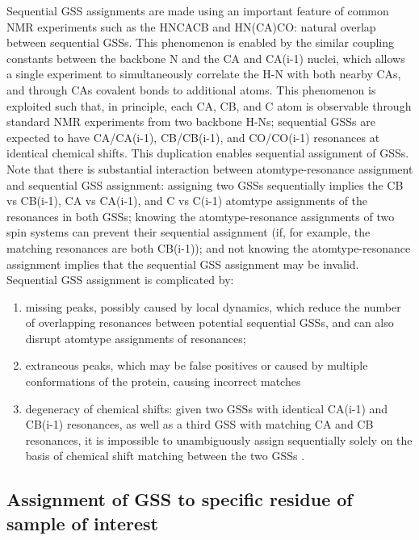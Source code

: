 Sequential GSS assignments are made using an important feature of common NMR 
experiments such as the HNCACB and HN(CA)CO: natural overlap between 
sequential GSSs.  This phenomenon is enabled by the similar coupling 
constants between the backbone N and the CA and CA(i-1) nuclei, which allows 
a single experiment to simultaneously correlate the H-N with both nearby CAs, 
and through CAs covalent bonds to additional atoms.  This phenomenon is 
exploited such that, in principle, each CA, CB, and C atom is observable 
through standard NMR experiments from two backbone H-Ns;  sequential GSSs 
are expected to have CA/CA(i-1), CB/CB(i-1), and CO/CO(i-1) resonances at 
identical chemical shifts.  This duplication enables sequential assignment 
of GSSs.  Note that there is substantial interaction between atomtype-resonance 
assignment and sequential GSS assignment: assigning two GSSs sequentially 
implies the CB vs CB(i-1), CA vs CA(i-1), and C vs C(i-1) atomtype assignments 
of the resonances in both GSSs; knowing the atomtype-resonance assignments of 
two spin systems can prevent their sequential assignment (if, for example, the 
matching resonances are both CB(i-1)); and not knowing the atomtype-resonance 
assignment implies that the sequential GSS assignment may be invalid.  
Sequential GSS assignment is complicated by: 
\begin{enumerate}
  \item missing peaks, possibly caused 
  by local dynamics, which reduce the number of overlapping resonances between 
  potential sequential GSSs, and can also disrupt atomtype assignments of 
  resonances; 
  \item extraneous peaks, which may be false positives or caused by 
  multiple conformations of the protein, causing incorrect matches
  \item degeneracy of chemical shifts:  given two GSSs with identical CA(i-1) 
  and CB(i-1) resonances, as well as a third GSS with matching CA and CB 
  resonances, it is impossible to unambiguously assign sequentially solely 
  on the basis of chemical shift matching between the two GSSs 
  \cite{autoassign1997}.
\end{enumerate}

\subsection{Assignment of GSS to specific residue of sample of interest}

